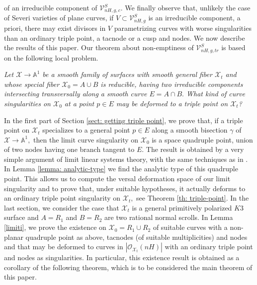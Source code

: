 \documentclass[plain]{amsart}
\begin{document}
of an irreducible component of $ \mathcal V_{nH,g,c}^S.$
We finally observe that, unlikely
the case of Severi varieties of plane curves, if $V\subset\mathcal V_{nH,g}^S$ is an irreducible component, 
a priori, there may exist divisors in $V$
parametrizing curves with worse singularities than an ordinary triple point, a tacnode or a cusp and nodes. 
We now describe the results of this paper. Our theorem about
non-emptiness of $\mathcal V_{nH,g,tr}^S$ is based on the following local problem.
\begin{trivlist}
\item[\hspace\labelsep{\bf  Problem 2}]
{\em  Let $\mathcal X\to\mathbb A^1$ be a smooth family of surfaces with smooth general fiber
$\mathcal X_t$ and whose special fiber $\mathcal X_0=A\cup B$
is reducible, having two irreducible components intersecting transversally along a 
smooth curve $E=A\cap B.$ What kind of curve singularities on $\mathcal X_0$ at a point $p\in E$
may be deformed to a triple point on $\mathcal X_t$? }
\end{trivlist}
In the first part of Section \ref{sect: getting triple point}, we prove that, 
if a triple point on $\mathcal X_t$ specializes to a general point $p\in E$
along a smooth bisection $\gamma$ of $\mathcal X\to\mathbb A^1,$ then the limit curve singularity on 
$\mathcal X_0$ is a space quadruple point, union of two nodes having one branch tangent to $E.$
The result is obtained by a very simple argument of limit linear systems theory, with the same techniques 
as in \cite{galati}. In Lemma \ref{lemma: analytic-type}
we find the analytic type of this quadruple point. This allows us to compute the versal deformation space
of our limit singularity and to prove that, under suitable hypotheses, it actually deforms to an ordinary triple point singularity
on $\mathcal X_t,$ see Theorem \ref{th: triple-point}. In the last section, we consider
the case that $\mathcal X_t$ is a general primitively
polarized $K3$ surface and $A=R_1$ and $B=R_2$ are two rational normal scrolls. In Lemma \ref{limiti},
we prove the existence on $\mathcal X_0=R_1\cup R_2$  of suitable curves with a non-planar quadruple
point as above, tacnodes (of suitable multiplicities) and nodes and that may be deformed to curves in $|\mathcal O_{\mathcal X_t}(nH)|$
with an ordinary triple point and nodes as singularities. In particular, this existence result is obtained as a corollary
of the following theorem, which is to be considered the main theorem of this paper. 
\end{document}
